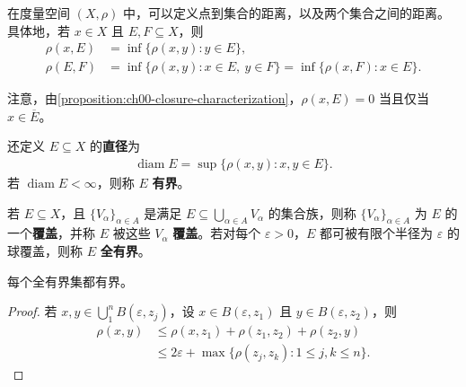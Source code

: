 \documentclass[../../main.tex]{subfiles}%
\begin{document}

\begin{definition}\label{definition:ch00-distance-diameter}
在度量空间 $(X,\rho)$ 中，可以定义点到集合的距离，以及两个集合之间的距离。具体地，若 $x\in X$ 且 $E,F\subseteq X$，则
\begin{align*}
\rho(x,E)&=\inf\{\rho(x,y):y\in E\},\\
\rho(E,F)&=\inf\{\rho(x,y):x\in E,\ y\in F\}=\inf\{\rho(x,F):x\in E\}.
\end{align*}
\end{definition}


\begin{remark}
注意，由\cref{proposition:ch00-closure-characterization}，$\rho(x,E)=0$ 当且仅当 $x\in\overline{E}$。
\end{remark}

\begin{definition}[直径与有界集]\label{definition:ch00-diameter-boundedness}
还定义 $E\subseteq X$ 的\textbf{直径}为
\begin{align*}
\operatorname{diam}E=\sup\{\rho(x,y):x,y\in E\}.
\end{align*}
若 $\operatorname{diam}E<\infty$，则称 $E$ \textbf{有界}。
\end{definition}



\begin{definition}[覆盖与全有界集]\label{definition:ch00-total-boundedness}
若 $E\subseteq X$，且 $\{V_\alpha\}_{\alpha\in A}$ 是满足 $E\subseteq\bigcup_{\alpha\in A}V_\alpha$ 的集合族，则称 $\{V_\alpha\}_{\alpha\in A}$ 为 $E$ 的一个\textbf{覆盖}，并称 $E$ 被这些 $V_\alpha$ \textbf{覆盖}。若对每个 $\varepsilon>0$，$E$ 都可被有限个半径为 $\varepsilon$ 的球覆盖，则称 $E$ \textbf{全有界}。
\end{definition}

\begin{proposition}\label{proposition:ch00-total-implies-bounded}
每个全有界集都有界。
\end{proposition}

\begin{proof}
若 $x,y\in\bigcup_1^nB(\varepsilon,z_j)$，设 $x\in B(\varepsilon,z_1)$ 且 $y\in B(\varepsilon,z_2)$，则
\begin{align*}
\rho(x,y)&\leqslant\rho(x,z_1)+\rho(z_1,z_2)+\rho(z_2,y)\\
&\leqslant2\varepsilon+\max\{\rho(z_j,z_k):1\leqslant j,k\leqslant n\}.
\end{align*}
\end{proof}
\end{document}

